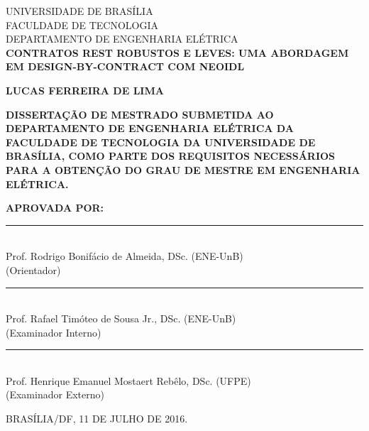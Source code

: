 \begin{bf}
\begin{center}
{\normalsize UNIVERSIDADE DE BRASÍLIA}\\
{\normalsize FACULDADE DE TECNOLOGIA}\\
{\normalsize DEPARTAMENTO DE ENGENHARIA ELÉTRICA}\\

\vspace{10mm}
{\large {\bf  CONTRATOS REST ROBUSTOS E LEVES: UMA ABORDAGEM EM
DESIGN-BY-CONTRACT COM NEOIDL }}

\vspace{10mm}
{\large {\bf LUCAS FERREIRA DE LIMA}}
\end{center}
\end{bf}

\vspace{10mm}

\noindent\MakeUppercase{ {\bf
Dissertação de Mestrado submetida ao
Departamento de Engenharia Elétrica
da Faculdade de Tecnologia da Universidade de Brasília,
como parte dos requisitos necessários para a obtenção do grau de mestre em
ENGENHARIA ELÉTRICA. }}

\vspace{5mm}

\noindent\MakeUppercase{ {\bf Aprovada por:}}

\vspace{10mm}

\begin{bf}
\noindent\rule{120mm}{0.1mm}\\
{ Prof. Rodrigo Bonifácio de Almeida, DSc. (ENE-UnB) }\\
{(Orientador)}

\vspace{7.5mm}

\noindent\rule{120mm}{0.1mm}\\
{ Prof. Rafael Timóteo de Sousa Jr., DSc. (ENE-UnB) }\\
{(Examinador Interno)}

\vspace{7.5mm}

\noindent\rule{120mm}{0.1mm}\\
{  Prof. Henrique Emanuel Mostaert Rebêlo, DSc. (UFPE) }\\
{(Examinador Externo)}

\vspace{7.5mm}

\vspace{7.5mm}
\noindent\MakeUppercase{Brasília/DF, 11 DE JULHO DE 2016.}
\end{bf}

\pagebreak


